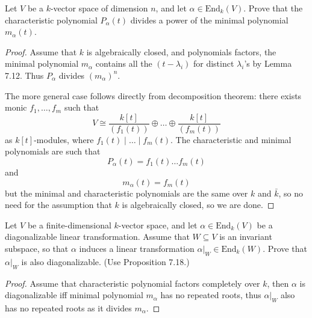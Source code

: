 \documentclass[openany]{book}
\begin{document}
\begin{prob}[7.8]
    Let \( V \) be a \( k \)-vector space of dimension \( n \), and let \( \alpha \in \text{End}_k(V) \). Prove that the characteristic polynomial \( P_\alpha(t) \) divides a power of the minimal polynomial \( m_\alpha(t) \).
\end{prob}
\begin{proof}
    Assume that $k$ is algebraically closed, and polynomials factors, the minimal polynomial $m_\alpha$ contains all the $(t-\lambda_i)$ for distinct $\lambda_i$'s by Lemma 7.12. Thus $P_\alpha$ divides $(m_\alpha)^n$.

    The more general case follows directly from decomposition theorem: there exists monic $f_1,\dots, f_m$ such that 
    \begin{equation*}
        V\cong\frac{k[t]}{(f_1(t))}\oplus\dots\oplus\frac{k[t]}{(f_m(t))}
    \end{equation*}
    as $k[t]$-modules, where $f_1(t)\mid\dots\mid f_m(t)$. The characteristic and minimal polynomials are such that 
    \begin{equation*}
        P_\alpha(t)=f_1(t)\dots f_m(t)
    \end{equation*}
    and 
    \begin{equation*}
        m_\alpha(t)=f_m(t)
    \end{equation*}
    but the minimal and characteristic polynomials are the same over $k$ and $\bar{k}$, so no need for the assumption that $k$ is algebraically closed, so we are done.
\end{proof}


\begin{prob}[7.12]
    Let \( V \) be a finite-dimensional \( k \)-vector space, and let \( \alpha \in \text{End}_k(V) \) be a diagonalizable linear transformation. Assume that \( W \subseteq V \) is an invariant subspace, so that \( \alpha \) induces a linear transformation \( \alpha|_W \in \text{End}_k(W) \). Prove that \( \alpha|_W \) is also diagonalizable. (Use Proposition 7.18.)
\end{prob}
\begin{proof}
    Assume that characteristic polynomial factors completely over $k$, then $\alpha$ is diagonalizable iff minimal polynomial $m_\alpha$ has no repeated roots, thus $\alpha\vert_W$ also has no repeated roots as it divides $m_\alpha$.
\end{proof}
\end{document}
